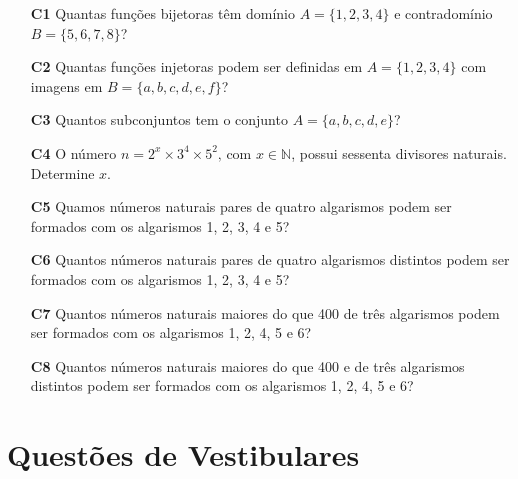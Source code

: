 \documentclass[a4paper,12pt]{article}
\begin{document}
\begin{enumerate}

\item[\textbf{C1}] Quantas funções bijetoras têm domínio $A = \{1, 2, 3, 4 \}$ e contradomínio $B = \{5, 6, 7, 8 \}$? 

\item[\textbf{C2}] Quantas funções injetoras podem ser definidas em $A = \{1, 2, 3, 4\}$ com imagens em $B = \{a, b, c, d, e, f\}$? 

\item[\textbf{C3}] Quantos subconjuntos tem o conjunto $A = \{a, b, c, d, e\}$? 

\item[\textbf{C4}] O número $n = 2^x \times 3^4 \times 5^2 \textrm{, com } x \in \mathbb{N}$, possui sessenta divisores naturais. Determine $x$. 

\item[\textbf{C5}] Quamos números naturais pares de quatro algarismos podem ser formados com os algarismos 1, 2, 3, 4 e 5? 

\item[\textbf{C6}] Quantos números naturais pares de quatro algarismos distintos podem ser formados com os algarismos 1, 2, 3, 4 e 5?

\item[\textbf{C7}] Quantos números naturais maiores do que 400 de três algarismos podem ser formados com os algarismos 1, 2, 4, 5 e 6?

\item[\textbf{C8}] Quantos números naturais maiores do que 400 e de três algarismos distintos podem ser formados com os algarismos 1, 2, 4, 5 e 6? 

\end{enumerate}

\section{Questões de Vestibulares}
\end{document}
